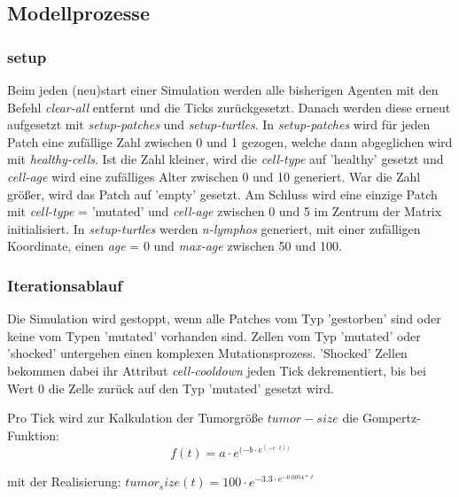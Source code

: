 \documentclass[conference]{IEEEtran}
\begin{document}
\subsection{Modellprozesse}

\subsubsection{setup}
Beim jeden (neu)start einer Simulation werden alle bisherigen Agenten mit den Befehl \emph{clear-all} entfernt und die Ticks zurückgesetzt. Danach werden diese erneut aufgesetzt mit \emph{setup-patches} und \emph{setup-turtles}.
\vspace{5mm}
In \emph{setup-patches} wird für jeden Patch eine zufällige Zahl zwischen 0 und 1 gezogen, welche dann abgeglichen wird mit \emph{healthy-cells}. Ist die Zahl kleiner, wird die \emph{cell-type} auf 'healthy' gesetzt und \emph{cell-age} wird eine zufälliges Alter zwischen 0 und 10 generiert. War die Zahl größer, wird das Patch auf 'empty' gesetzt. Am Schluss wird eine einzige Patch mit \emph{cell-type} = 'mutated' und \emph{cell-age} zwischen 0 und 5 im Zentrum der Matrix initialisiert.
\vspace{5mm}
In \emph{setup-turtles} werden \emph{n-lymphos} generiert, mit einer zufälligen Koordinate, einen \emph{age} = 0 und  \emph{max-age} zwischen 50 und 100.

\subsubsection{Iterationsablauf}

Die Simulation wird gestoppt, wenn alle Patches vom Typ 'gestorben' sind oder keine vom Typen 'mutated' vorhanden sind.
\vspace{5mm}
Zellen vom Typ 'mutated' oder 'shocked' untergehen einen komplexen Mutationsprozess. 'Shocked' Zellen bekommen dabei ihr Attribut \emph{cell-cooldown} jeden Tick dekrementiert, bis bei Wert 0 die Zelle zurück auf den Typ 'mutated' gesetzt wird.

Pro Tick wird zur Kalkulation der Tumorgröße \(tumor-size\) die Gompertz-Funktion: 
\begin{equation*}
	f(t) = a \cdot e^{(-b \cdot e^{(-c \cdot t))}}
\end{equation*} 

mit der Realisierung: 
\begin{math}
	tumor_size(t) =  100 \cdot e ^ {- 3.3 \cdot e ^ {- 0.0054 *\cdot t}}
\end{math}
\end{document}
